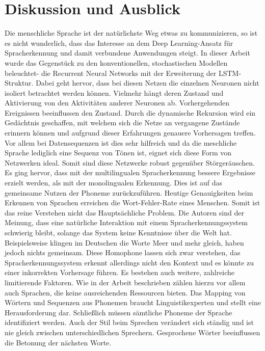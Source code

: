 \section{Diskussion und Ausblick}
Die menschliche Sprache ist der natürlichste Weg etwas zu kommunizieren, so ist es nicht wunderlich, dass das Interesse an dem Deep Learning-Ansatz für Spracherkennung und damit verbundene Anwendungen steigt. In dieser Arbeit wurde das Gegenstück zu den konventionellen, stochastischen Modellen beleuchtet- die Recurrent Neural Networks mit der Erweiterung der LSTM-Struktur. Dabei geht hervor, dass bei diesen Netzen die einzelnen Neuronen nicht isoliert betrachtet werden können. Vielmehr hängt deren Zustand und Aktivierung von den Aktivitäten anderer Neuronen ab. Vorhergehenden Ereignissen beeinflussen den Zustand. Durch die dynamische Rekursion wird ein Gedächtnis geschaffen, mit welchem sich die Netze an vergangene Zustände erinnern können und aufgrund dieser Erfahrungen genauere Vorhersagen treffen. Vor allem bei Datensequenzen ist dies sehr hilfreich und da die meschliche Sprache lediglich eine Sequenz von Tönen ist, eignet sich diese Form von Netzwerken ideal. Somit sind diese Netzwerke robust gegenüber Störgeräuschen. Es ging hervor, dass mit der multilingualen Spracherkennung bessere Ergebnisse erzielt werden, als mit der monolingualen Erkennung. Dies ist auf das gemeinsame Nutzen der Phoneme zurückzuführen. Heutige Genauigkeiten beim Erkennen von Sprachen erreichen die Wort-Fehler-Rate eines Menschen. Somit ist das reine Verstehen nicht das Hauptsächliche Problem. Die Autoren sind der Meinung, dass eine natürliche Interaktion mit einem Spracherkennungssystem schwierig bleibt, solange das System keine Kenntnisse über die Welt hat. Beispielsweise klingen im Deutschen die Worte Meer und mehr gleich, haben jedoch nichts gemeinsam. Diese Homophone lassen sich zwar verstehen, das Spracherkennungssystem erkennt allerdings nicht den Kontext und es könnte zu einer inkorrekten Vorhersage führen. Es bestehen auch weitere, zahlreiche limitierende Faktoren. Wie in der Arbeit beschrieben zählen hierzu vor allem auch Sprachen, die keine ausreichenden Ressourcen bieten. Das Mapping von Wörtern und Sequenzen aus Phonemen braucht Linguistikexperten und stellt eine Herausforderung dar. Schließlich müssen sämtliche Phoneme der Sprache identifiziert werden. Auch der Stil beim Sprechen verändert sich ständig und ist nie gleich zwischen unterschiedlichen Sprechern. Gesprochene Wörter beeinflussen die Betonung der nächsten Worte.   
